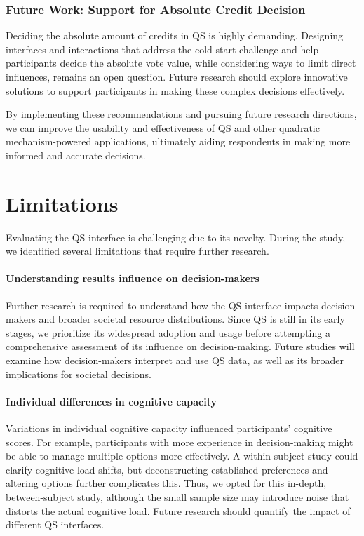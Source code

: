 \subsubsection{Future Work: Support for Absolute Credit Decision}
Deciding the absolute amount of credits in QS is highly demanding. Designing interfaces and interactions that address the cold start challenge and help participants decide the absolute vote value, while considering ways to limit direct influences, remains an open question. Future research should explore innovative solutions to support participants in making these complex decisions effectively.

By implementing these recommendations and pursuing future research directions, we can improve the usability and effectiveness of QS and other quadratic mechanism-powered applications, ultimately aiding respondents in making more informed and accurate decisions.

\section{Limitations}
\label{sec:limitations}
Evaluating the QS interface is challenging due to its novelty. During the study, we identified several limitations that require further research.

\paragraph{Understanding results influence on decision-makers}
Further research is required to understand how the QS interface impacts decision-makers and broader societal resource distributions. Since QS is still in its early stages, we prioritize its widespread adoption and usage before attempting a comprehensive assessment of its influence on decision-making. Future studies will examine how decision-makers interpret and use QS data, as well as its broader implications for societal decisions.

\paragraph{Individual differences in cognitive capacity}
Variations in individual cognitive capacity influenced participants' cognitive scores. For example, participants with more experience in decision-making might be able to manage multiple options more effectively. A within-subject study could clarify cognitive load shifts, but deconstructing established preferences and altering options further complicates this. Thus, we opted for this in-depth, between-subject study, although the small sample size may introduce noise that distorts the actual cognitive load. Future research should quantify the impact of different QS interfaces.

